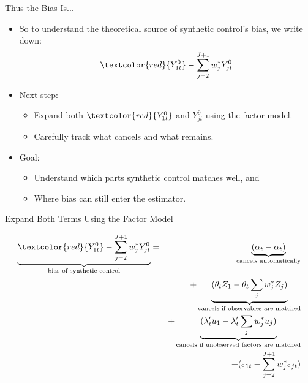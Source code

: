 \documentclass{beamer}
\begin{document}
\begin{frame}{Thus the Bias Is...}
  \begin{itemize}
    \item So to understand the theoretical source of synthetic control's bias, we write down:
    \[
    \textcolor{red}{Y_{1t}^0} - \sum_{j=2}^{J+1} w_j^* Y_{jt}^0
    \]
    \item Next step:
    \begin{itemize}
      \item Expand both $\textcolor{red}{Y_{1t}^0}$ and $Y_{jt}^0$ using the factor model.
      \item Carefully track what cancels and what remains.
    \end{itemize}
    \item Goal:
    \begin{itemize}
      \item Understand which parts synthetic control matches well, and
      \item Where bias can still enter the estimator.
    \end{itemize}
  \end{itemize}
\end{frame}

\begin{frame}{Expand Both Terms Using the Factor Model}

\begin{eqnarray*}
\underbrace{\textcolor{red}{Y_{1t}^0} - \sum_{j=2}^{J+1} w_j^* Y_{jt}^0}_{\text{bias of synthetic control}} &=& \underbrace{(\alpha_t - \alpha_t)}_{\text{cancels automatically}} \\
&& + \underbrace{(\theta_t Z_1 - \theta_t \sum_j w_j^* Z_j)}_{\text{cancels if observables are matched}} \\
&& + \underbrace{(\lambda_t' u_1 - \lambda_t' \sum_j w_j^* u_j)}_{\text{cancels if unobserved factors are matched}} \\
&& + (\varepsilon_{1t} - \sum_{j=2}^{J+1} w_j^* \varepsilon_{jt})
\end{eqnarray*}
\end{frame}
\end{document}
